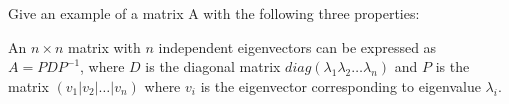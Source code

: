 \documentclass[solution,addpoints,12pt]{exam}
\newenvironment{Solution}{\begin{solution}}{\end{solution}}
\begin{document}
\begin{questions}
\question  Give an example of a matrix A with the following three properties:
        \begin{Solution}
        An $n \times n$ matrix with $n$ independent eigenvectors can be expressed as $A=PDP^{-1}$, where $D$ is the diagonal matrix $diag(\lambda_1 \lambda_2\dots \lambda_n)$ and $P$ is the matrix $(v_1|v_2|\dots|v_n)$ where $v_i$ is the  eigenvector corresponding to eigenvalue $\lambda_i$.\\
        

\end{Solution}
\end{questions}
\end{document}
